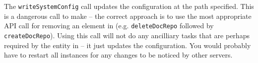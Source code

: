 The \verb+writeSystemConfig+ call updates the configuration at the path specified. This is a dangerous call to make -- the
correct approach is to use the most appropriate API call for removing an element in \Rapture (e.g. \verb+deleteDocRepo+ followed by \verb+createDocRepo+). Using this call will
not do any ancilliary tasks that are perhaps required by the entity in \Rapture -- it just updates the configuration. You would probably have to
restart all \Rapture instances for any changes to be noticed by other servers.
